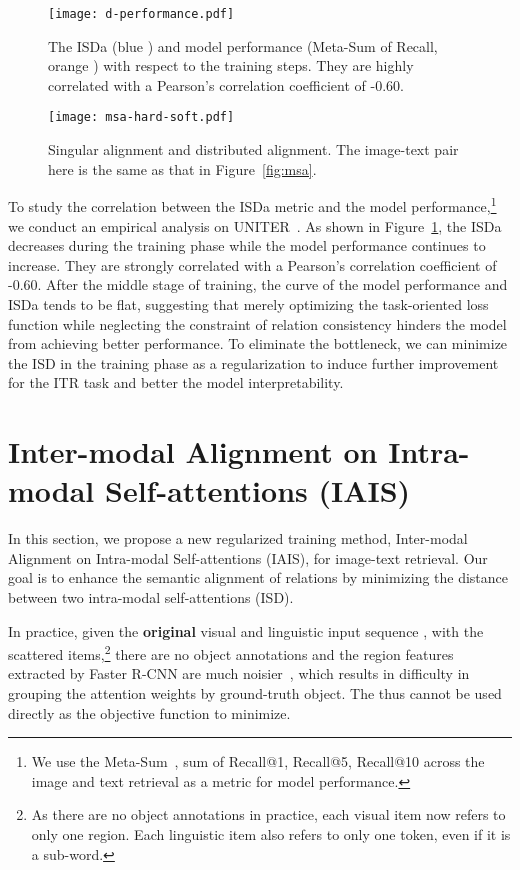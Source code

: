\documentclass[11pt,a4paper]{article}
\begin{document}
%
 
\begin{figure}[t]
    \centering
    \texttt{[image: d-performance.pdf]}
    \caption{The ISDa (blue ) and model performance (Meta-Sum of Recall, orange ) with respect to the training steps. They are highly correlated with a Pearson's correlation coefficient of -0.60.}
    \label{fig:msd-performance}
\end{figure}


\begin{figure*}[t!]
    \centering
    \texttt{[image: msa-hard-soft.pdf]}
    \caption{Singular alignment and distributed alignment. The image-text pair here is the same as that in Figure~\ref{fig:msa}.}
    \label{fig:msa-hard-soft}
\end{figure*}

To study the correlation between the ISDa metric and the model performance,\footnote{We use the Meta-Sum~\cite{UNITER}, sum of Recall@1, Recall@5, Recall@10 across the image and text retrieval as a metric for model performance.} we conduct an empirical analysis on UNITER~\cite{UNITER}. 
As shown in Figure~\ref{fig:msd-performance}, the ISDa decreases during the training phase while the model performance continues to increase. 
They are strongly correlated with a Pearson's correlation coefficient of -0.60.
After the middle stage of training, the curve of the model performance and ISDa tends to be flat, suggesting that merely optimizing the task-oriented loss function while neglecting the constraint of relation consistency hinders the model from achieving better performance. To eliminate the bottleneck, we can minimize the ISD in the training phase as a regularization to induce further improvement for the ITR task and better the model interpretability.

\section{Inter-modal Alignment on Intra-modal Self-attentions (IAIS)}
In this section, we propose a new regularized training method, Inter-modal Alignment on Intra-modal Self-attentions (IAIS), for image-text retrieval. 
Our goal is to enhance the semantic alignment of relations by minimizing the distance between two intra-modal self-attentions (ISD). 

In practice, given the \textbf{original} visual and linguistic input sequence ,  with the scattered items,\footnote{As there are no object annotations in practice, each visual item now refers to only one region. 
Each linguistic item also refers to only one token, even if it is a sub-word.} there are no object annotations and the region features extracted by Faster R-CNN are much noisier~\cite{Oscar, BUTD}, which results in difficulty in grouping the attention weights by ground-truth object. 
The  thus cannot be used directly as the objective function to minimize. 
\end{document}

